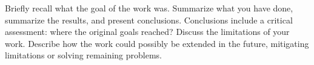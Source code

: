 
Briefly recall what the goal of the work was. Summarize what you have done, summarize the results, and present conclusions. Conclusions include a critical assessment: where the original goals reached? Discuss the limitations of your work. Describe how the work could possibly be extended in the future, mitigating limitations or solving remaining problems.